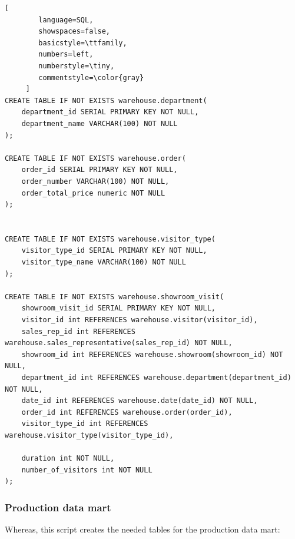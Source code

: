 \documentclass[letterpaper,12pt]{article}
\begin{document}
\begin{lstlisting}[
        language=SQL,
        showspaces=false,
        basicstyle=\ttfamily,
        numbers=left,
        numberstyle=\tiny,
        commentstyle=\color{gray}
     ]
CREATE TABLE IF NOT EXISTS warehouse.department(
	department_id SERIAL PRIMARY KEY NOT NULL,
	department_name VARCHAR(100) NOT NULL
);

CREATE TABLE IF NOT EXISTS warehouse.order(
	order_id SERIAL PRIMARY KEY NOT NULL,
	order_number VARCHAR(100) NOT NULL,
	order_total_price numeric NOT NULL
);


CREATE TABLE IF NOT EXISTS warehouse.visitor_type(
	visitor_type_id SERIAL PRIMARY KEY NOT NULL,
	visitor_type_name VARCHAR(100) NOT NULL
);

CREATE TABLE IF NOT EXISTS warehouse.showroom_visit(
	showroom_visit_id SERIAL PRIMARY KEY NOT NULL,
	visitor_id int REFERENCES warehouse.visitor(visitor_id),
	sales_rep_id int REFERENCES warehouse.sales_representative(sales_rep_id) NOT NULL,
	showroom_id int REFERENCES warehouse.showroom(showroom_id) NOT NULL,
	department_id int REFERENCES warehouse.department(department_id) NOT NULL,
	date_id int REFERENCES warehouse.date(date_id) NOT NULL,
	order_id int REFERENCES warehouse.order(order_id),
	visitor_type_id int REFERENCES warehouse.visitor_type(visitor_type_id),

	duration int NOT NULL,
	number_of_visitors int NOT NULL
);

\end{lstlisting}


\subsubsection{Production data mart}
Whereas, this script creates the needed tables for the production data mart:
\end{document}
